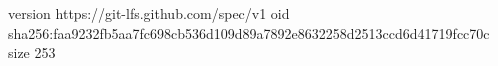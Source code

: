 version https://git-lfs.github.com/spec/v1
oid sha256:faa9232fb5aa7fc698cb536d109d89a7892e8632258d2513ccd6d41719fcc70c
size 253
